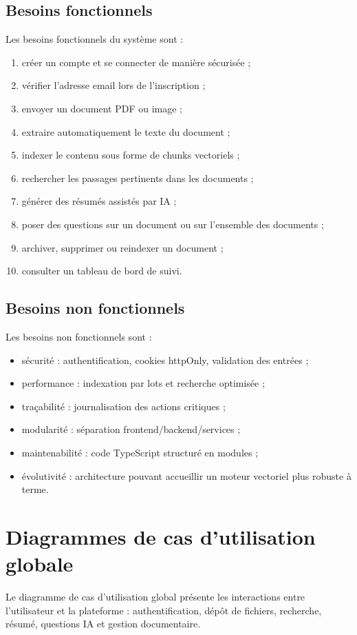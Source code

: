 \documentclass[12pt,a4paper]{report}
\begin{document}
\subsection{Besoins fonctionnels}
Les besoins fonctionnels du système sont :
\begin{enumerate}
  \item créer un compte et se connecter de manière sécurisée ;
  \item vérifier l'adresse email lors de l'inscription ;
  \item envoyer un document PDF ou image ;
  \item extraire automatiquement le texte du document ;
  \item indexer le contenu sous forme de chunks vectoriels ;
  \item rechercher les passages pertinents dans les documents ;
  \item générer des résumés assistés par IA ;
  \item poser des questions sur un document ou sur l'ensemble des documents ;
  \item archiver, supprimer ou reindexer un document ;
  \item consulter un tableau de bord de suivi.
\end{enumerate}

\subsection{Besoins non fonctionnels}
Les besoins non fonctionnels sont :
\begin{itemize}
  \item sécurité : authentification, cookies httpOnly, validation des entrées ;
  \item performance : indexation par lots et recherche optimisée ;
  \item traçabilité : journalisation des actions critiques ;
  \item modularité : séparation frontend/backend/services ;
  \item maintenabilité : code TypeScript structuré en modules ;
  \item évolutivité : architecture pouvant accueillir un moteur vectoriel plus robuste à terme.
\end{itemize}

\section{Diagrammes de cas d'utilisation globale}
Le diagramme de cas d'utilisation global présente les interactions entre l'utilisateur et la plateforme : authentification, dépôt de fichiers, recherche, résumé, questions IA et gestion documentaire.
\end{document}
